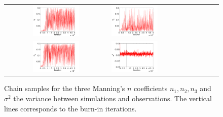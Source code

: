 \begin{figure}[ht]
\begin{tabular}{clc}
\includegraphics[width=0.475\textwidth]{./figures/chain_p1.pdf} &
\includegraphics[width=0.475\textwidth]{./figures/chain_p2.pdf} \\
\includegraphics[width=0.475\textwidth]{./figures/chain_p3.pdf} &
\includegraphics[width=0.475\textwidth]{./figures/chain_s1.pdf}
\end{tabular}
\caption{Chain samples for the three Manning's $n$ coefficients $n_1,n_2,n_3$ and $\sigma^2$
the variance between simulations and observations. The vertical lines corresponds to the
burn-in iterations.}
\label{fig:mcmc} 
\end{figure}
